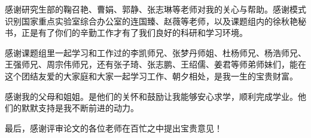 
感谢研究生部的鞠召艳、曹娟、郭静、张志琳等老师对我的关心与帮助。感谢模式识别国家重点实验室综合办公室的连国臻、赵薇等老师，以及课题组内的徐秋艳秘书，正是有了你们的辛勤工作才有了我们良好的科研和学习环境。

感谢课题组里一起学习和工作过的李凯师兄、张梦丹师姐、杜杨师兄、杨浩师兄、王强师兄、周宗伟师兄，还有张子琦、张志鹏、王绍儒、姜君等师弟师妹们，能在这个团结友爱的大家庭和大家一起学习工作、朝夕相处，是我一生的宝贵财富。

感谢我的父母和姐姐。是他们的关怀和鼓励让我能够安心求学，顺利完成学业。他们的默默支持是我不断前进的动力。

最后，感谢评审论文的各位老师在百忙之中提出宝贵意见！

\vspace{8mm}

\cleardoublepage[plain]%

